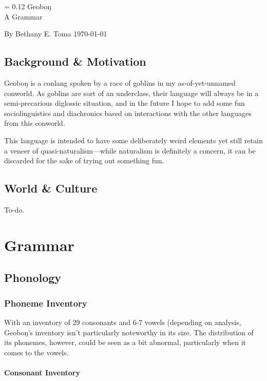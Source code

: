 \documentclass[a4paper,11pt,oneside,openany]{memoir}
\newcommand{\engma}{ŋ}
\newlength{\drop}%
\newcommand*{\titleP}{\begingroup%
\drop = 0.12\textheight
\vspace*{\drop}
\hspace*{0.3\textwidth}
{\HUGE\sc Geobo\engma}\\[\baselineskip]
\hspace*{0.33\textwidth}
{\huge A Grammar}\par
\vspace*{3\drop}
{\large By {\sc Bethany E. Toma}}
\vfill
{\today}
\vspace*{0.5\drop}
\endgroup}
\begin{document}
\begin{titlingpage}
\titleP
\end{titlingpage}
\frontmatter

\pagestyle{headings}

\chapter{Background \& Motivation}

Geobo{\engma} is a conlang spoken by a race of goblins in my as-of-yet-unnamed conworld. As goblins are sort of an underclass, their language will always be in a semi-precarious diglossic situation, and in the future I hope to add some fun sociolinguistics and diachronics based on interactions with the other languages from this conworld.

This language is intended to have some deliberately weird elements yet still retain a veneer of quasi-naturalism---while naturalism is definitely a concern, it can be discarded for the sake of trying out something fun.

\clearpage
\tableofcontents

\chapter{World \& Culture}

To-do.

\mainmatter

\part{Grammar}

\chapter{Phonology}

\section{Phoneme Inventory}

With an inventory of 29 consonants and 6-7 vowels (depending on analysis, Geobo\engma's inventory isn't particularly noteworthy in its size. The distribution of its phonemes, however, could be seen as a bit abnormal, particularly when it comes to the vowels.

\subsection{Consonant Inventory}
\end{document}

